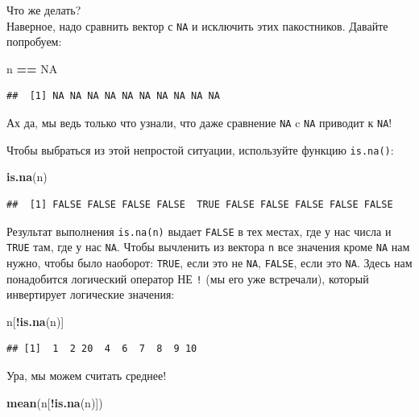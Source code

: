 \documentclass[
]{book}
\newenvironment{Shaded}{\begin{snugshade}}{\end{snugshade}}
\newcommand{\KeywordTok}[1]{\textcolor[rgb]{0.13,0.29,0.53}{\textbf{#1}}}
\newcommand{\NormalTok}[1]{#1}
\newcommand{\OperatorTok}[1]{\textcolor[rgb]{0.81,0.36,0.00}{\textbf{#1}}}
\newcommand{\OtherTok}[1]{\textcolor[rgb]{0.56,0.35,0.01}{#1}}
\newcommand{\StringTok}[1]{\textcolor[rgb]{0.31,0.60,0.02}{#1}}
\begin{document}
Что же делать?\\
Наверное, надо сравнить вектор с \texttt{NA} и исключить этих пакостников. Давайте попробуем:

\begin{Shaded}
\begin{Highlighting}[]
\NormalTok{n }\OperatorTok{==}\StringTok{ }\OtherTok{NA}
\end{Highlighting}
\end{Shaded}

\begin{verbatim}
##  [1] NA NA NA NA NA NA NA NA NA NA
\end{verbatim}

Ах да, мы ведь только что узнали, что даже сравнение \texttt{NA} c \texttt{NA} приводит к \texttt{NA}!

Чтобы выбраться из этой непростой ситуации, используйте функцию \texttt{is.na()}:

\begin{Shaded}
\begin{Highlighting}[]
\KeywordTok{is.na}\NormalTok{(n)}
\end{Highlighting}
\end{Shaded}

\begin{verbatim}
##  [1] FALSE FALSE FALSE FALSE  TRUE FALSE FALSE FALSE FALSE FALSE
\end{verbatim}

Результат выполнения \texttt{is.na(n)} выдает \texttt{FALSE} в тех местах, где у нас числа и \texttt{TRUE} там, где у нас \texttt{NA}. Чтобы вычленить из вектора \texttt{n} все значения кроме \texttt{NA} нам нужно, чтобы было наоборот: \texttt{TRUE}, если это не \texttt{NA}, \texttt{FALSE}, если это \texttt{NA}. Здесь нам понадобится логический оператор НЕ \texttt{!} (мы его уже встречали), который инвертирует логические значения:

\begin{Shaded}
\begin{Highlighting}[]
\NormalTok{n[}\OperatorTok{!}\KeywordTok{is.na}\NormalTok{(n)]}
\end{Highlighting}
\end{Shaded}

\begin{verbatim}
## [1]  1  2 20  4  6  7  8  9 10
\end{verbatim}

Ура, мы можем считать среднее!

\begin{Shaded}
\begin{Highlighting}[]
\KeywordTok{mean}\NormalTok{(n[}\OperatorTok{!}\KeywordTok{is.na}\NormalTok{(n)])}
\end{Highlighting}
\end{Shaded}
\end{document}
